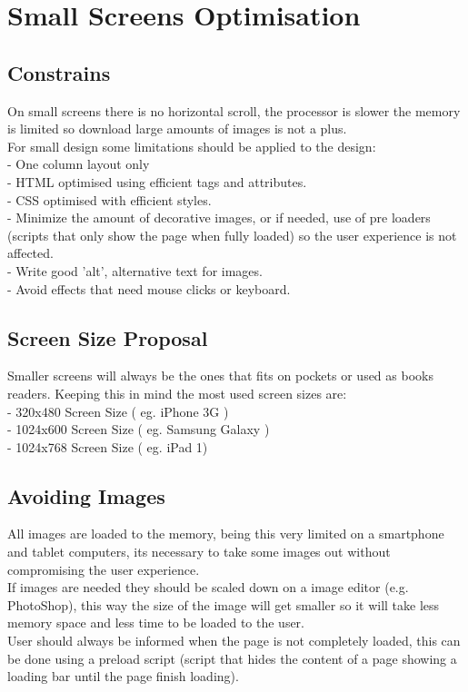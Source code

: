 

\section{Small Screens Optimisation}
\subsection{Constrains}
On small screens there is no horizontal scroll, the processor is slower the memory is limited so download large amounts of images is not a plus.\\
For small design some limitations should be applied to the design:\\
- One column layout only\\
- HTML optimised using efficient tags and attributes.\\
- CSS optimised with efficient styles.\\
- Minimize the amount of decorative images, or if needed, use of pre loaders (scripts that only show the page when fully loaded) so the user experience is not affected.\\
- Write good 'alt', alternative text for images.\\
- Avoid effects that need mouse clicks or keyboard.\\
\subsection{Screen Size Proposal}
Smaller screens will always be the ones that fits on pockets or used as books readers. Keeping this in mind the most used screen sizes are:\\
- 320x480 Screen Size ( eg. iPhone 3G )\\
- 1024x600 Screen Size ( eg. Samsung Galaxy )\\
- 1024x768 Screen Size ( eg. iPad 1)\\
\subsection{Avoiding Images}
All images are loaded to the memory, being this very limited on a smartphone and tablet computers, its necessary to take some images out without compromising the user experience.\\
If images are needed they should be scaled down on a image editor (e.g. PhotoShop), this way the size of the image will get smaller so it will take less memory space and less time to be loaded to the user.\\
User should always be informed when the page is not completely loaded, this can be done using a preload script (script that hides the content of a page showing a loading bar until the page finish loading).\\ 
